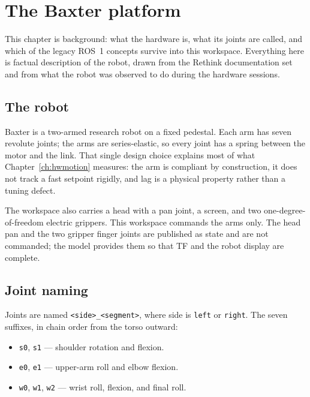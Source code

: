 \chapter{The Baxter platform}
\label{ch:platform}

This chapter is background: what the hardware is, what its joints are called, and
which of the legacy ROS~1 concepts survive into this workspace. Everything here
is factual description of the robot, drawn from the Rethink documentation set and
from what the robot was observed to do during the hardware sessions.

\section{The robot}

Baxter is a two-armed research robot on a fixed pedestal. Each arm has seven
revolute joints; the arms are series-elastic, so every joint has a spring between
the motor and the link. That single design choice explains most of what
Chapter~\ref{ch:hwmotion} measures: the arm is compliant by construction, it does
not track a fast setpoint rigidly, and lag is a physical property rather than a
tuning defect.

The workspace also carries a head with a pan joint, a screen, and two
one-degree-of-freedom electric grippers. This workspace commands the arms only.
The head pan and the two gripper finger joints are published as state and are not
commanded; the model provides them so that TF and the robot display are complete.

\section{Joint naming}

Joints are named \texttt{<side>\_<segment>}, where side is \texttt{left} or
\texttt{right}. The seven suffixes, in chain order from the torso outward:

\begin{center}
\resizebox{\linewidth}{!}{}
\end{center}

\begin{itemize}
  \item \texttt{s0}, \texttt{s1} --- shoulder rotation and flexion.
  \item \texttt{e0}, \texttt{e1} --- upper-arm roll and elbow flexion.
  \item \texttt{w0}, \texttt{w1}, \texttt{w2} --- wrist roll, flexion, and final roll.
\end{itemize}

